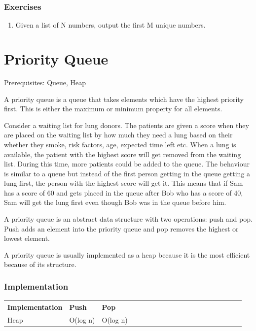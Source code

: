 \documentclass[11pt,oneside]{book}
\begin{document}
\subsection{Exercises}

\begin{enumerate}
\item Given a list of N numbers, output the first M unique numbers.
\end{enumerate}

    \chapter{ Priority Queue }
        

Prerequisites: Queue, Heap

A priority queue is a queue that takes elements which have the highest priority first. This is either the maximum or minimum property for all elements.

Consider a waiting list for lung donors. The patients are given a score when they are placed on the waiting list by how much they need a lung based on their whether they smoke, risk factors, age, expected time left etc. When a lung is available, the patient with the highest score will get removed from the waiting list. During this time, more patients could be added to the queue. The behaviour is similar to a queue but instead of the first person getting in the queue getting a lung first, the person with the highest score will get it. This means that if Sam has a score of 60 and gets placed in the queue after Bob who has a score of 40, Sam will get the lung first even though Bob was in the queue before him.

A priority queue is an abstract data structure with two operations: push and pop. Push adds an element into the priority queue and pop removes the highest or lowest element.

A priority queue is usually implemented as a heap because it is the most efficient because of its structure.

\subsection{Implementation}

\vspace{10px}\begin{tabulary}{0.4\linewidth}{|l|l|l|l|l|l|l|l|l|l|l|l|l|l|l|l|l|l|l}\hline


  Implementation &
  Push &
  Pop\\
\hline


  Heap &
  O(log n) &
  O(log n)\\

\hline\end{tabulary}
\end{document}
